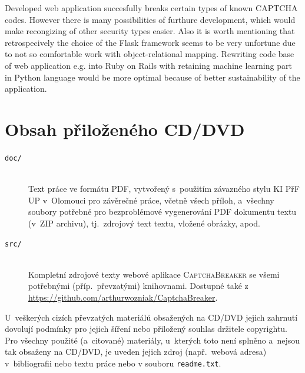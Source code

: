 \documentclass[
  field=ainfp,
  master=true,
  biblatex,
  sourcecodes=false,
  theorems=false,
  glossaries,
  index
]{kidiplom}
\begin{document}
\begin{kiconclusions}[english]
Developed web application succesfully breaks certain types of known CAPTCHA codes. However there is many possibilities of furthure development, which would make recongizing of other security types easier. Also it is worth mentioning that retrospecively the choice of the Flask framework seems to be very unfortune due to not so comfortable work with object-relational mapping. Rewriting code base of web application e.g. into Ruby on Rails with retaining machine learning part in Python language would be more optimal because of better sustainability of the application. 
\end{kiconclusions}

\appendix

\section{Obsah přiloženého CD/DVD} \label{sec:ObsahCD}

\begin{description}

\item[\texttt{doc/}] \hfill \\
  Text práce ve formátu PDF, vytvořený s~použitím závazného stylu KI
  PřF UP v~Olomouci pro závěrečné práce, včetně všech příloh,
  a~všechny soubory potřebné pro bezproblémové vygenerování PDF
  dokumentu textu (v~ZIP archivu), tj.~zdrojový text textu, vložené
  obrázky, apod.

\item[\texttt{src/}] \hfill \\
  Kompletní zdrojové texty webové aplikace \textsc{CaptchaBreaker} se všemi potřebnými (příp.~převzatými) knihovnami. Dostupné také z \url{https://github.com/arthurwozniak/CaptchaBreaker}.

\end{description}

U~veškerých cizích převzatých materiálů obsažených na CD/DVD jejich
zahrnutí dovolují podmínky pro jejich šíření nebo přiložený souhlas
držitele copyrightu. Pro všechny použité (a~citované) materiály,
u~kterých toto není splněno a~nejsou tak obsaženy na CD/DVD, je uveden
jejich zdroj (např.~webová adresa) v~bibliografii nebo textu práce
nebo v souboru \texttt{readme.txt}.

\end{document}
